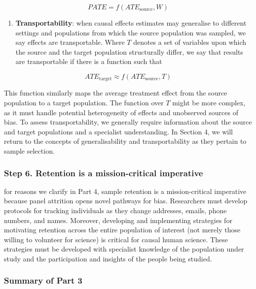 \documentclass[
  singlecolumn]{article}
\providecommand{\tightlist}{%
  \setlength{\itemsep}{0pt}\setlength{\parskip}{0pt}}\usepackage{longtable,booktabs,array}
\begin{document}
\[PATE =  f(ATE_{\text{source}}, W)\]

\begin{enumerate}
\def\labelenumi{\arabic{enumi}.}
\setcounter{enumi}{3}
\tightlist
\item
  \textbf{Transportability}: when causal effects estimates may
  generalise to different settings and populations from which the source
  population was sampled, we say effects are transportable. Where \(T\)
  denotes a set of variables upon which the source and the target
  population structurally differ, we say that results are transportable
  if there is a function such that
\end{enumerate}

\[ATE_{\text{target}} \approx f(ATE_{\text{source}}, T)\]

This function similarly maps the average treatment effect from the
source population to a target population. The function over \(T\) might
be more complex, as it must handle potential heterogeneity of effects
and unobserved sources of bias. To assess transportability, we generally
require information about the source and target populations and a
specialist understanding. In Section 4, we will return to the concepts
of generalisability and transportability as they pertain to sample
selection.

\subsubsection{Step 6. Retention is a mission-critical
imperative}\label{step-6.-retention-is-a-mission-critical-imperative}

for reasons we clarify in Part 4, sample retention is a mission-critical
imperative because panel attrition opens novel pathways for bias.
Researchers must develop protocols for tracking individuals as they
change addresses, emails, phone numbers, and names. Moreover, developing
and implementing strategies for motivating retention across the entire
population of interest (not merely those willing to volunteer for
science) is critical for causal human science. These strategies must be
developed with specialist knowledge of the population under study and
the participation and insights of the people being studied.

\subsubsection{Summary of Part 3}\label{summary-of-part-3}
\end{document}
